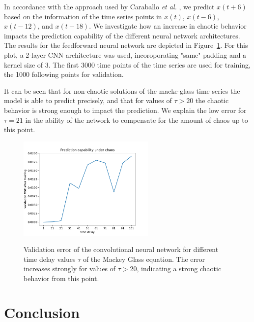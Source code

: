 \documentclass{article}
\begin{document}
In accordance with the approach used by Caraballo \textit{et al.}
\cite{caraballo2016}, we predict $x(t+6)$ based on the information of the time 
series points in $x(t)$, $x(t-6)$, $x(t-12)$, and $x(t-18)$. We investigate how
an increase in chaotic behavior impacts the prediction capability of the
different neural network architectures. The results for the feedforward neural
network are depicted in Figure~\ref{fig:mackey_cnn}. For this plot, a 2-layer 
CNN architecture was used, incoroporating "same" padding and a kernel size of 3.
The first 3000 time points of the time series are used for training, the 1000 
following points for validation.

It can be seen that for non-chaotic solutions of the macke-glass time series the
model is able to predict precisely, and that for values of $\tau > 20$ the 
chaotic behavior is strong enough to impact the prediction. We explain the low
error for $\tau = 21$ in the ability of the network to compensate for the amount
of chaos up to this point.
 
\begin{figure}
  \centering
  \includegraphics[width=0.6\textwidth]{figures/mackey_glass_cnn.pdf}
  \label{fig:mackey_cnn}
  \caption{Validation error of the convolutional neural network for different 
  time delay values $\tau$ of the Mackey Glass equation. The error increases 
  strongly for values of $\tau > 20$, indicating a strong chaotic behavior 
  from this point.}
\end{figure}


\section{Conclusion}



\end{document}
